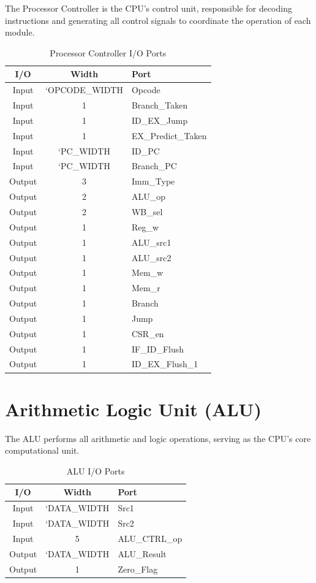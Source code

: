 \documentclass[12pt,a4paper]{report}
\begin{document}
The Processor Controller is the CPU's control unit, responsible for decoding instructions and generating all control signals to coordinate the operation of each module.

\begin{table}[htbp]
\centering
\caption{Processor Controller I/O Ports}
\begin{tabular}{|c|c|l|}
\hline
\textbf{I/O} & \textbf{Width} & \textbf{Port} \\
\hline
Input & `OPCODE\_WIDTH & Opcode \\
Input & 1 & Branch\_Taken \\
Input & 1 & ID\_EX\_Jump \\
Input & 1 & EX\_Predict\_Taken \\
Input & `PC\_WIDTH & ID\_PC \\
Input & `PC\_WIDTH & Branch\_PC \\
Output & 3 & Imm\_Type \\
Output & 2 & ALU\_op \\
Output & 2 & WB\_sel \\
Output & 1 & Reg\_w \\
Output & 1 & ALU\_src1 \\
Output & 1 & ALU\_src2 \\
Output & 1 & Mem\_w \\
Output & 1 & Mem\_r \\
Output & 1 & Branch \\
Output & 1 & Jump \\
Output & 1 & CSR\_en \\
Output & 1 & IF\_ID\_Flush \\
Output & 1 & ID\_EX\_Flush\_1 \\
\hline
\end{tabular}
\end{table}

\newpage
\section{Arithmetic Logic Unit (ALU)}

The ALU performs all arithmetic and logic operations, serving as the CPU's core computational unit.

\begin{table}[htbp]
\centering
\caption{ALU I/O Ports}
\begin{tabular}{|c|c|l|}
\hline
\textbf{I/O} & \textbf{Width} & \textbf{Port} \\
\hline
Input & `DATA\_WIDTH & Src1 \\
Input & `DATA\_WIDTH & Src2 \\
Input & 5 & ALU\_CTRL\_op \\
Output & `DATA\_WIDTH & ALU\_Result \\
Output & 1 & Zero\_Flag \\
\hline
\end{tabular}
\end{table}
\end{document}
